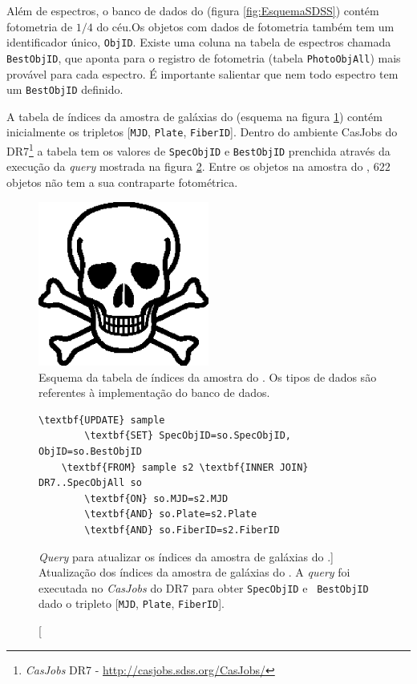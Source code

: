 Além de espectros, o banco de dados do \SDSS (figura \ref{fig:EsquemaSDSS})
contém fotometria de $1/4$ do céu.\citneed Os objetos com dados de fotometria
também tem um identificador único, {\tt ObjID}. Existe uma coluna na tabela de
espectros chamada {\tt BestObjID}, que aponta para o registro de fotometria
(tabela {\tt PhotoObjAll}) mais provável para cada espectro. É importante
salientar que nem todo espectro tem um {\tt BestObjID} definido.

A tabela de índices da amostra de galáxias do \starlight (esquema na figura
\ref{fig:TabelaAmostraStarlight}) contém inicialmente os tripletos [{\tt MJD},
{\tt Plate}, {\tt FiberID}]. Dentro do ambiente {CasJobs} do \SDSS
DR7\footnote{{\em CasJobs} \SDSS DR7 - \url{http://casjobs.sdss.org/CasJobs/}} a
tabela tem os valores de {\tt SpecObjID} e {\tt BestObjID} prenchida através da
execução da {\em query} mostrada na figura \ref{fig:AtualizaObjIds}. Entre os
objetos na amostra do \starlight, $622$ objetos não tem a sua contraparte
fotométrica.

\begin{figure}
	\includegraphics[width=0.5\textwidth]{figuras/test.eps}
	\caption[Esquema da tabela de índices da amostra do \starlight.]
	{Esquema da tabela de índices da amostra do \starlight. Os tipos de dados são
	referentes à implementação do banco de dados.}
	\label{fig:TabelaAmostraStarlight}
\end{figure}

\begin{figure}
	\begin{Verbatim}[commandchars=\\\{\}]
	\textbf{UPDATE} sample
		\textbf{SET} SpecObjID=so.SpecObjID, ObjID=so.BestObjID
	\textbf{FROM} sample s2 \textbf{INNER JOIN} DR7..SpecObjAll so
		\textbf{ON} so.MJD=s2.MJD
		\textbf{AND} so.Plate=s2.Plate
		\textbf{AND} so.FiberID=s2.FiberID
	\end{Verbatim}
	\caption
	[{\em Query} para atualizar os índices da amostra de galáxias do
	\starlight.]
	{Atualização dos índices da amostra de galáxias do \starlight. A {\em query}
	foi executada no {\em CasJobs} do \SDSS DR7 para obter {\tt SpecObjID} e {\tt
	BestObjID} dado o tripleto [{\tt MJD}, {\tt Plate}, {\tt FiberID}].}
	\label{fig:AtualizaObjIds}
\end{figure}


